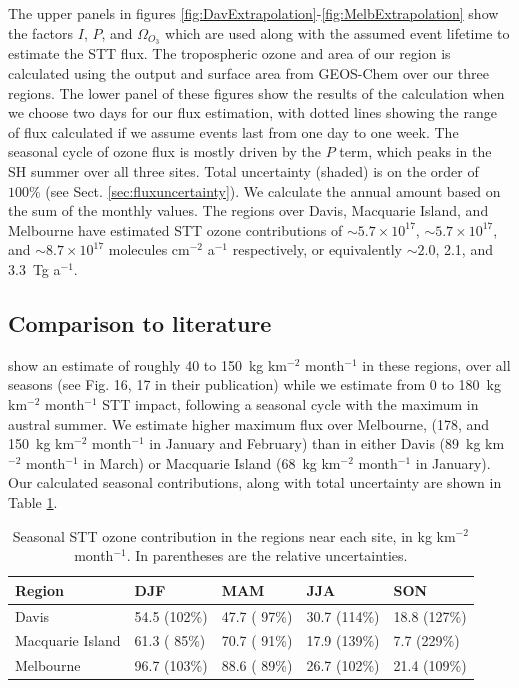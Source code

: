 \documentclass[acp, manuscript]{copernicus} %
\begin{document}
    The upper panels in figures \ref{fig:DavExtrapolation}-\ref{fig:MelbExtrapolation} show the factors $I$, $P$, and $\Omega_{O_3}$ which are used along with the assumed event lifetime to estimate the STT flux.
    The tropospheric ozone and area of our region is calculated using the output and surface area from GEOS-Chem over our three regions.
    The lower panel of these figures show the results of the calculation when we choose two days for our flux estimation, with dotted lines showing the range of flux calculated if we assume events last from one day to one week.
    The seasonal cycle of ozone flux is mostly driven by the $P$ term, which peaks in the SH summer over all three sites.
    Total uncertainty (shaded) is on the order of $100\%$ (see Sect. \ref{sec:fluxuncertainty}). 
    We calculate the annual amount based on the sum of the monthly values.
    The regions over Davis, Macquarie Island, and Melbourne have estimated STT ozone contributions of $\sim 5.7 \times 10^{17}$, $\sim 5.7 \times 10^{17}$, and $\sim 8.7 \times 10^{17}$ molecules cm$^{-2}$ a$^{-1}$ respectively, or equivalently $\sim 2.0$, 2.1, and 3.3~Tg a$^{-1}$.
  
  \subsection{Comparison to literature}
    \cite{Skerlak2014} show an estimate of roughly 40 to 150~kg km$^{-2}$ month$^{-1}$ in these regions, over all seasons (see Fig. 16, 17 in their publication) while we estimate from 0 to 180~kg km$^{-2}$ month$^{-1}$ STT impact, following a seasonal cycle with the maximum in austral summer.
    We estimate higher maximum flux over Melbourne, (178, and 150~kg km$^{-2}$ month$^{-1}$ in January and February) than in either Davis (89~kg km$^{-2}$ month$^{-1}$ in March) or Macquarie Island (68~kg km$^{-2}$ month$^{-1}$ in January).
    Our calculated seasonal contributions, along with total uncertainty are shown in Table \ref{table:extrapolationResults}.
    
    \begin{table}[t]
      \captionsetup{justification=centering}
      \caption{Seasonal STT ozone contribution in the regions near each site, in kg km$^{-2}$ month$^{-1}$. In parentheses are the relative uncertainties.}
      \begin{tabular}{ l l l l l } 
	\hline
	Region & DJF & MAM & JJA & SON \\
	\hline
	Davis        &  54.5 (102\%) & 47.7 ( 97\%) & 30.7 (114\%) & 18.8 (127\%)\\ 
	Macquarie Island   & 61.3 ( 85\%) & 70.7 ( 91\%) & 17.9 (139\%) &  7.7 (229\%) \\
	Melbourne   & 96.7 (103\%) & 88.6 ( 89\%) & 26.7 (102\%) & 21.4 (109\%) \\
	\hline
      \end{tabular}
      \label{table:extrapolationResults}
    \end{table}
    
\end{document}
